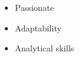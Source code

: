
\twocolumnsection
{
\begin{skills}
\end{skills}}
{
\vspace{1em}
\begin{itemize}
	\item Passionate
	\item Adaptability                    
    \item Analytical skills
\end{itemize}
}